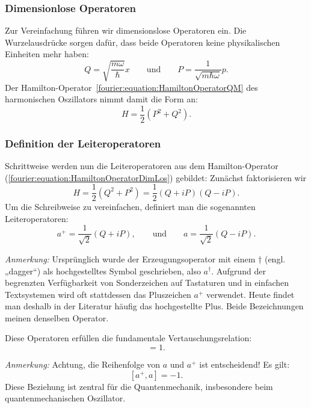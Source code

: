 		\subsubsection{Dimensionlose Operatoren\label{fourier:subsubsection:DimensionsloseOperatoren}}
			Zur Vereinfachung führen wir dimensionslose Operatoren ein.
			Die Wurzelausdrücke sorgen dafür, dass beide Operatoren keine physikalischen Einheiten mehr haben:
			\[
				Q = \sqrt{\frac{m\omega}{\hbar}}x
				\qquad\text{und}\qquad
				P = \frac{1}{\sqrt{m\hbar\omega}}p.
			\]
			Der Hamilton-Operator~\ref{fourier:equation:HamiltonOperatorQM} des harmonischen Oszillators nimmt damit die Form an:
			\begin{equation}\label{fourier:equation:HamiltonOperatorDimLos}
				H = \frac{1}{2}(P^2 + Q^2).
			\end{equation}

		\subsubsection{Definition der Leiteroperatoren\label{fourier:subsubsection:DefinitionLeiteroperatoren}}
			Schrittweise werden nun die Leiteroperatoren aus dem Hamilton-Operator (\ref{fourier:equation:HamiltonOperatorDimLos}) gebildet:
			Zunächst faktorisieren wir
			\[
				H = \frac{1}{2}(Q^2 + P^2) = \frac{1}{2}(Q + iP)(Q - iP).
			\]
			Um die Schreibweise zu vereinfachen, definiert man die sogenannten Leiteroperatoren:
			\begin{equation}
				a^+ = \frac{1}{\sqrt{2}}(Q + iP),
				\qquad\text{und}\qquad
				a = \frac{1}{\sqrt{2}}(Q - iP).
			\end{equation}

			\textit{Anmerkung:}
			Ursprünglich wurde der Erzeugungsoperator mit einem $\dagger$ (engl. „dagger“) als hochgestelltes Symbol geschrieben, also $a^\dagger$.
			Aufgrund der begrenzten Verfügbarkeit von Sonderzeichen auf Tastaturen und in einfachen Textsystemen wird oft stattdessen das Pluszeichen $a^+$ verwendet.
			Heute findet man deshalb in der Literatur häufig das hochgestellte Plus.
			Beide Bezeichnungen meinen denselben Operator.

			Diese Operatoren erfüllen die fundamentale Vertauschungsrelation:
			\begin{equation}
				[a, a^+] = 1.
			\end{equation}

			\textit{Anmerkung:}
			Achtung, die Reihenfolge von $a$ und $a^+$ ist entscheidend! Es gilt:
			\[
				[a^+, a] = -1.
			\]
			Diese Beziehung ist zentral für die Quantenmechanik, insbesondere beim quantenmechanischen Oszillator.


